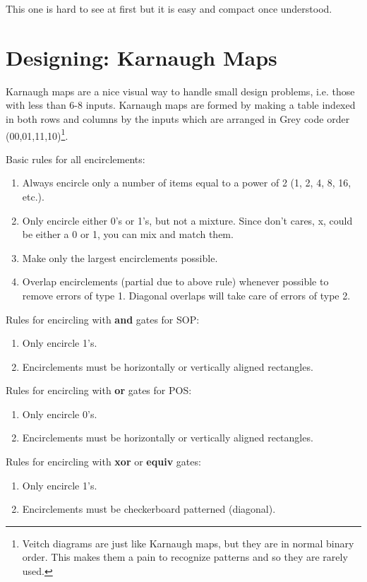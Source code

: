 \vspace{.1in}
This one is hard to see at first but it is easy and compact once understood.

\section{Designing: Karnaugh Maps}

Karnaugh maps are a nice visual way to handle small design problems, i.e. those with less than 6-8 inputs.  Karnaugh maps are formed by making a table indexed in both rows and columns by the inputs which are arranged in Grey code order (00,01,11,10)\footnote{Veitch diagrams are just like Karnaugh maps, but they are in normal binary order.  This makes them a pain to recognize patterns and so they are rarely used.}.

Basic rules for all encirclements:
\begin{enumerate}
\item Always encircle only a number of items equal to a power of 2 (1, 2, 4, 8, 16, etc.).
\item Only encircle either 0's or 1's, but not a mixture.  Since don't cares, x, could be either a 0 or 1, you can mix and match them.
\item Make only the largest encirclements possible.
\item Overlap encirclements (partial due to above rule) whenever possible to remove errors of type 1.  Diagonal overlaps will take care of errors of type 2.
\end{enumerate}

Rules for encircling with \textbf{and} gates for SOP:
\begin{enumerate}
\item Only encircle 1's.
\item Encirclements must be horizontally or vertically aligned rectangles.
\end{enumerate}

Rules for encircling with \textbf{or} gates for POS:
\begin{enumerate}
\item Only encircle 0's.
\item Encirclements must be horizontally or vertically aligned rectangles.
\end{enumerate}

Rules for encircling with \textbf{xor} or \textbf{equiv} gates:
\begin{enumerate}
\item Only encircle 1's.
\item Encirclements must be checkerboard patterned (diagonal).
\end{enumerate}


